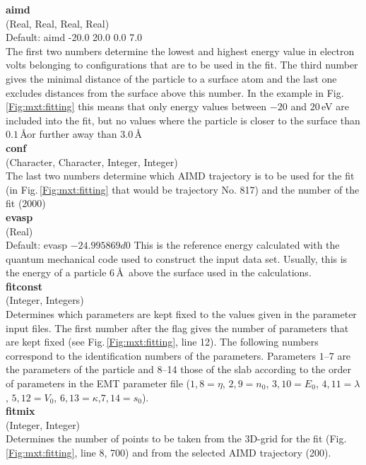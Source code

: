 \documentclass[twoside, 11pt, titlepage, captions=nooneline, a4paper, headsepline]{scrbook}%
\newcommand{\9}{\mathrm}
\newcommand{\0}{\,\mathrm}
\begin{document}
\noindent\textbf{aimd}\\
(Real, Real, Real, Real)\\ 
Default: aimd -20.0 20.0 0.0 7.0\\
The first two numbers determine the lowest and highest energy value in electron volts belonging to configurations that are to be used in the fit. The third number gives the minimal distance of the particle to a surface atom and the last one excludes distances from the surface above this number. In the example in Fig.\,\ref{Fig:mxt:fitting} this means that only energy values between $-20$ and $20$\,eV are included into the fit, but no values where the particle is closer to the surface than $0.1$\,\AA or further away than $3.0$\,\AA\\

\noindent\textbf{conf}\\
(Character, Character, Integer, Integer)\\ 
The last two numbers determine which AIMD trajectory is to be used for the fit (in Fig.\,\ref{Fig:mxt:fitting} that would be trajectory No. 817) and the number of the fit (2000)\\

\noindent\textbf{evasp}\\
(Real)\\ 
Default: evasp $-24.995869d0$
This is the reference energy calculated with the quantum mechanical code used to construct the input data set. Usually, this is the energy of a particle 6\,\AA~above the surface used in the calculations.\\

\noindent\textbf{fitconst}\\
(Integer, Integers)\\
Determines which parameters are kept fixed to the values given in the parameter input files. The first number after the flag gives the number of parameters that are kept fixed (see Fig.\,\ref{Fig:mxt:fitting}, line 12). The following numbers correspond to the identification numbers of the parameters. Parameters $1$--$7$ are the parameters of the particle and 8--14 those of the slab according to the order of parameters in the EMT parameter file ($1,8 = \eta$, $2,9 = n_0$, $3,10 = E_0$, $4,11 = \lambda$, $5,12 = V_0$, $6,13 = \kappa$,$7,14 = s_0$).\\

\noindent\textbf{fitmix}\\
(Integer, Integer)\\
Determines the number of points to be taken from the 3D-grid for the fit (Fig.\,\ref{Fig:mxt:fitting}, line 8, 700) and from the selected AIMD trajectory (200).\\
\end{document}
